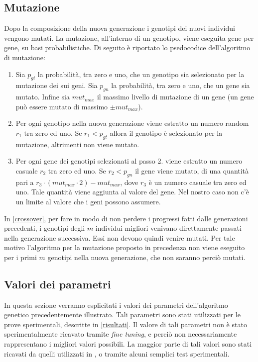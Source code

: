 \documentclass[a4paper,12pt]{article}
\begin{document}
\subsection{Mutazione} \label{mutazione}
Dopo la composizione della nuova generazione i genotipi dei nuovi individui vengono mutati. La mutazione, all'interno di un genotipo, viene eseguita gene per gene, su basi probabilistiche. Di seguito è riportato lo psedocodice dell'algoritmo di mutazione:
\begin{enumerate}
	\item Sia $p_{gt}$ la probabilità, tra zero e uno, che un genotipo sia selezionato per la mutazione dei sui geni. Sia $p_{gn}$ la probabilità, tra zero e uno, che un gene sia mutato. Infine sia $mut_{max}$ il massimo livello di mutazione di un gene (un gene può essere mutato di massimo $\pm mut_{max}$).
	\item Per ogni genotipo nella nuova generazione viene estratto un numero random $r_1$ tra zero ed uno. Se $r_1 < p_{gt}$ allora il genotipo è selezionato per la mutazione, altrimenti non viene mutato.
	\item Per ogni gene dei genotipi selezionati al passo 2. viene estratto un numero casuale $r_2$ tra zero ed uno. Se $r_2 < p_{gn}$ il gene viene mutato, di una quantità pari a $r_3 \cdot (mut_{max} \cdot 2) - mut_{max}$, dove $r_3$ è un numero casuale tra zero ed uno. Tale quantità viene aggiunta al valore del gene. Nel nostro caso non c'è un limite al valore che i geni possono assumere. 
\end{enumerate}
In \autoref{crossover}, per fare in modo di non perdere i progressi fatti dalle generazioni precedenti, i genotipi degli $m$ individui migliori venivano direttamente passati nella generazione successiva. Essi non devono quindi venire mutati. Per tale motivo l'algoritmo per la mutazione proposto in precedenza non viene eseguito per i primi $m$ genotipi nella nuova generazione, che non saranno perciò mutati.
\subsection{Valori dei parametri} \label{valore-dei-parametri}
In questa sezione verranno esplicitati i valori dei parametri dell'algoritmo genetico precedentemente illustrato. Tali parametri sono stati utilizzati per le prove sperimentali, descritte in \autoref{risultati}. Il valore di tali parametri non è stato sperimentalmente ricavato tramite \emph{fine tuning}, e perciò non necessariamente rappresentano i migliori valori possibili. La maggior parte di tali valori sono stati ricavati da quelli utilizzati in \cite{arztRepo}, o tramite alcuni semplici test sperimentali.
\end{document}

